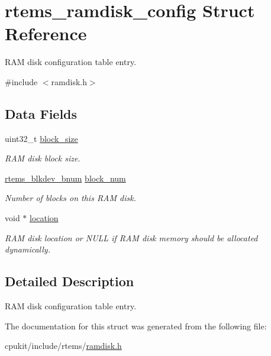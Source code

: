 \hypertarget{structrtems__ramdisk__config}{}\section{rtems\+\_\+ramdisk\+\_\+config Struct Reference}
\label{structrtems__ramdisk__config}


R\+AM disk configuration table entry.  




{\ttfamily \#include $<$ramdisk.\+h$>$}

\subsection*{Data Fields}
\begin{DoxyCompactItemize}
\item 
\mbox{\label{structrtems__ramdisk__config_a7b9fb7122ff9a4910fb62b9e309d1c96}} 
uint32\+\_\+t \mbox{\hyperlink{structrtems__ramdisk__config_a7b9fb7122ff9a4910fb62b9e309d1c96}{block\+\_\+size}}
\begin{DoxyCompactList}\small\item\em R\+AM disk block size. \end{DoxyCompactList}\item 
\mbox{\label{structrtems__ramdisk__config_a5afa726e9169b7592a8305b7daed3d5b}} 
\mbox{\hyperlink{group__rtems__disk_ga5fbcfd40b657bff6c54d9e393fab3274}{rtems\+\_\+blkdev\+\_\+bnum}} \mbox{\hyperlink{structrtems__ramdisk__config_a5afa726e9169b7592a8305b7daed3d5b}{block\+\_\+num}}
\begin{DoxyCompactList}\small\item\em Number of blocks on this R\+AM disk. \end{DoxyCompactList}\item 
\mbox{\label{structrtems__ramdisk__config_a112ca7b8b4960f2431007feaf66707a3}} 
void $\ast$ \mbox{\hyperlink{structrtems__ramdisk__config_a112ca7b8b4960f2431007feaf66707a3}{location}}
\begin{DoxyCompactList}\small\item\em R\+AM disk location or {\ttfamily N\+U\+LL} if R\+AM disk memory should be allocated dynamically. \end{DoxyCompactList}\end{DoxyCompactItemize}


\subsection{Detailed Description}
R\+AM disk configuration table entry. 

The documentation for this struct was generated from the following file\+:\begin{DoxyCompactItemize}
\item 
cpukit/include/rtems/\mbox{\hyperlink{ramdisk_8h}{ramdisk.\+h}}\end{DoxyCompactItemize}
